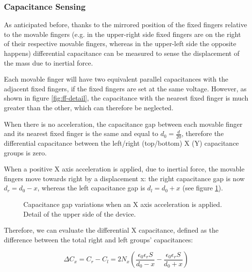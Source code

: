 \documentclass[lettersize,journal]{IEEEtran}
\begin{document}
        \subsubsection{Capacitance Sensing}\label{sssec:capacity}
        As anticipated before, thanks to the mirrored position of the fixed fingers relative to the movable fingers (e.g. in the upper-right side fixed fingers are on the right of their respective movable fingers, whereas in the upper-left side the opposite happens) differential capacitance can be measured to sense the displacement of the mass due to inertial force.
        
        Each movable finger will have two equivalent parallel capacitances with the adjacent fixed fingers, if the fixed fingers are set at the same voltage. However, as shown in figure \ref{fig:ff-detail}, the capacitance with the nearest fixed finger is much greater than the other, which can therefore be neglected.
        
        When there is no acceleration, the capacitance gap between each movable finger and its nearest fixed finger is the same and equal to \(d_0=\frac{d}{20}\), therefore the differential capacitance between the left/right (top/bottom) X (Y) capacitance groups is zero.
        
        When a positive X axis acceleration is applied, due to inertial force, the movable fingers move towards right by a displacement x: the right capacitance gap is now \(d_r=d_0-x\), whereas the left capacitance gap is \(d_l=d_0+x\) (see figure \ref{fig:capacitance_drawing}).
        
        \begin{figure}[!h]
            \centering
            
            \caption{Capacitance gap variations when an X axis acceleration is applied. Detail of the upper side of the device.}
            \label{fig:capacitance_drawing}
        \end{figure}
        
        Therefore, we can evaluate the differential X capacitance, defined as the difference between the total right and left groups' capacitances:
        
        \begin{equation}\label{eq:x_cap_calc}
            \Delta C_x = C_r - C_l = 2N_x\left(\frac{\epsilon_{0}\epsilon_{r}S}{d_0-x}-\frac{\epsilon_{0}\epsilon_{r}S}{d_0+x}\right)
        \end{equation}
        
\end{document}
